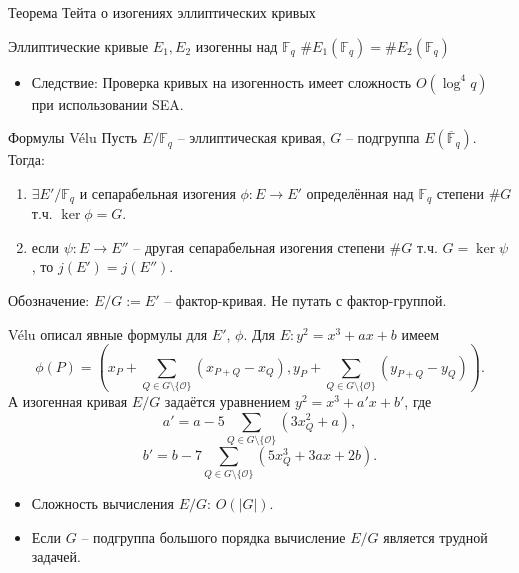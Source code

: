 \documentclass{beamer}
\begin{document}
\begin{frame}{Теорема Тейта о изогениях эллиптических кривых}
    \begin{center}
        Эллиптические кривые $E_1, E_2$ изогенны над $\mathbb{F}_q$ \structure{$\iff$} $\#E_1(\mathbb{F}_q) = \#E_2(\mathbb{F}_q)$
    \end{center}
    \begin{itemize}
        \item Следствие: Проверка кривых на изогенность имеет сложность $O(\log^4{q})$ при использовании SEA.
    \end{itemize}
\end{frame}

\begin{frame}{Формулы V\'{e}lu}
Пусть $E/\mathbb{F}_q$ -- эллиптическая кривая, $G$ -- подгруппа $E(\overline{\mathbb{F}}_q)$. Тогда:
\begin{enumerate}
    \item $\exists E'/\mathbb{F}_q$ и сепарабельная изогения $\phi: E \rightarrow E'$ определённая над $\mathbb{F}_q$ степени $\#G$ т.ч. $\ker\phi = G$.
    \item если $\psi: E \rightarrow E''$ -- другая сепарабельная изогения степени $\#G$ т.ч. $G = \ker\psi$, то $j(E') = j(E'')$.
\end{enumerate}
Обозначение: $E/G := E'$ -- фактор-кривая. Не путать с фактор-группой.
\end{frame}

\begin{frame}
V\'{e}lu описал явные формулы для $E'$, $\phi$. Для $E: y^2 = x^3 + a x + b$ имеем
\[
\phi(P)
=
\left(
  x_P + \sum_{Q \in G \setminus \{\mathcal{O}\}} \left( x_{P+Q} - x_Q \right),
  y_P + \sum_{Q \in G \setminus \{ \mathcal{O} \}} \left( y_{P+Q} - y_Q \right)
\right).
\]
А изогенная кривая $E/G$ задаётся уравнением $y^2 = x^3 + a' x + b'$, где
\[
a' = a - 5 \sum_{Q \in G \setminus \{ \mathcal{O} \}} \left( 3 x_Q^2 + a \right),
\]
\[
b' = b - 7 \sum_{Q \in G \setminus \{\mathcal{O}\}} \left(
5 x_Q^3 + 3 a x + 2 b
\right).
\]
\end{frame}

\begin{frame}
\begin{itemize}
  \item Сложность вычисления $E/G$: $O(|G|)$. 
  \item Если $G$ -- подгруппа большого порядка вычисление $E/G$ является трудной задачей.
\end{itemize}
\end{frame}
\end{document}
